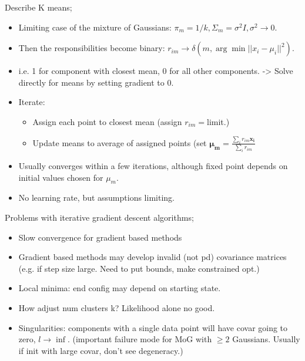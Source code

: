 \documentclass{article}
\begin{document}
Describe K means; \begin{itemize} \item Limiting case of the mixture of Gaussians: $\pi_m = 1/k, \Sigma_m=\sigma^2I, \sigma^2\rightarrow 0$.  \item Then the responsibilities become binary: $r_{im}\rightarrow\delta(m, \arg\min ||x_i-\mu_i||^2)$.  \item i.e. 1 for component with closest mean, 0 for all other components. -> Solve directly for means by setting gradient to 0.  \item Iterate: \begin{itemize} \item Assign each point to closest mean (assign $r_{im}=$limit.) \item Update means to average of assigned points (set $\mathbf{\mu_m}=\frac{\sum_i r_{im}\mathbf{x_i}}{\sum_i r_{im}}$ \end{itemize} \item Usually converges within a few iterations, although fixed point depends on initial values chosen for $\mu_m$.  \item No learning rate, but assumptions limiting.  \end{itemize}

Problems with iterative gradient descent algorithms; \begin{itemize} \item Slow convergence for gradient based methods \item Gradient based methods may develop invalid (not pd) covariance matrices (e.g. if step size large. Need to put bounds, make constrained opt.) \item Local minima: end config may depend on starting state.  \item How adjust num clusters k? Likelihood alone no good.  \item Singularities: components with a single data point will have covar going to zero, $l\rightarrow\inf$. (important failure mode for MoG with $\geq 2$ Gaussians. Usually if init with large covar, don't see degeneracy.) \end{itemize}
\end{document}
